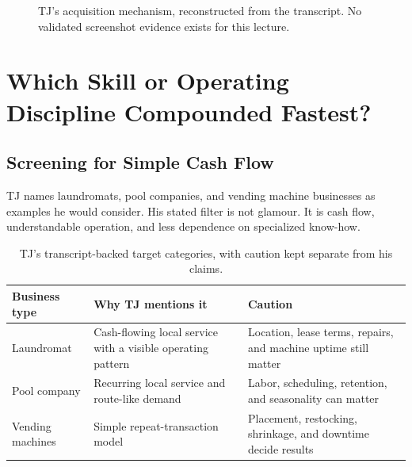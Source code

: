 \documentclass[11pt,oneside]{book}
\begin{document}
\begin{figure}
\centering
{}
\caption{TJ's acquisition mechanism, reconstructed from the transcript. No validated screenshot evidence exists for this lecture.}
\end{figure}

\chapter{Which Skill or Operating Discipline Compounded Fastest?}

\section{Screening for Simple Cash Flow}

TJ names laundromats, pool companies, and vending machine businesses as examples he would consider. His stated filter is not glamour. It is cash flow, understandable operation, and less dependence on specialized know-how.

\begin{table}
\centering
\begin{tabular}{|p{.24\linewidth}|p{.32\linewidth}|p{.32\linewidth}|}
\hline
Business type & Why TJ mentions it & Caution\\
\hline
Laundromat & Cash-flowing local service with a visible operating pattern & Location, lease terms, repairs, and machine uptime still matter\\
\hline
Pool company & Recurring local service and route-like demand & Labor, scheduling, retention, and seasonality can matter\\
\hline
Vending machines & Simple repeat-transaction model & Placement, restocking, shrinkage, and downtime decide results\\
\hline
\end{tabular}
\caption{TJ's transcript-backed target categories, with caution kept separate from his claims.}
\end{table}
\end{document}
